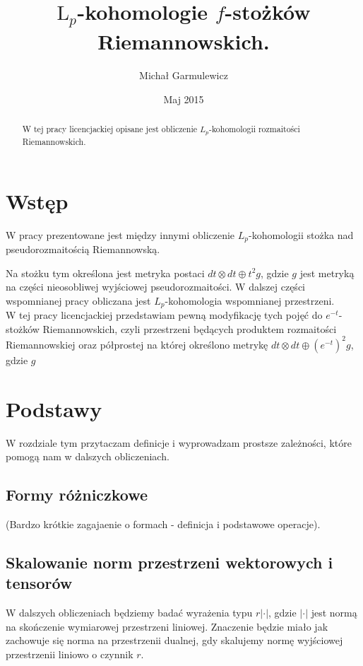 \documentclass[licencjacka]{pracamgr}
\author{Michał Garmulewicz}
\title{$\mathrm{L}_p$-kohomologie $f$-stożków Riemannowskich.}
\date{Maj 2015}
\theoremstyle{definition}
\theoremstyle{definition}
\theoremstyle{plain}
\theoremstyle{plain}
\begin{document}
\maketitle

\begin{abstract}
  W tej pracy licencjackiej opisane jest obliczenie $L_p$-kohomologii
  rozmaitości Riemannowskich.
\end{abstract}

\tableofcontents

\chapter{Wstęp}

W pracy \cite{weber} prezentowane jest między innymi obliczenie
$L_p$-kohomologii stożka nad pseudorozmaitością Riemannowską. 

Na stożku tym określona jest metryka postaci
$dt \otimes dt \oplus t^2 g$, gdzie $g$ 
jest metryką na części nieosobliwej wyjściowej pseudorozmaitości.
W dalszej części wspomnianej pracy obliczana jest $L_p$-kohomologia
wspomnianej przestrzeni.
\\


W tej pracy licencjackiej przedstawiam pewną modyfikację tych pojęć
do $e^{-t}$-stożków Riemannowskich, czyli przestrzeni będących produktem rozmaitości
Riemannowskiej oraz półprostej na której określono metrykę
$dt \otimes dt \oplus (e^{-t})^2 g$, gdzie $g$ 


\chapter{Podstawy}
W rozdziale tym przytaczam definicje i wyprowadzam prostsze zależności, które
pomogą nam w dalszych obliczeniach. \\


\section{Formy różniczkowe}
(Bardzo krótkie zagajaenie o formach - definicja i podstawowe operacje). \\

\section{Skalowanie norm przestrzeni wektorowych i tensorów}
W dalszych obliczeniach będziemy badać wyrażenia typu $r |\cdot|$, gdzie
$|\cdot|$ jest normą na skończenie wymiarowej przestrzeni liniowej.
Znaczenie będzie miało jak zachowuje się norma na przestrzenii dualnej,
gdy skalujemy normę wyjściowej przestrzenii liniowo o czynnik $r$. \\
\end{document}
